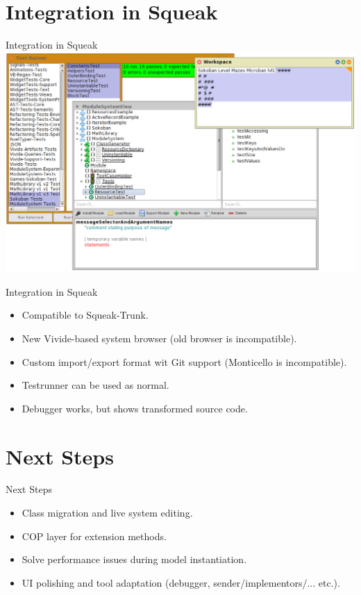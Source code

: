 \documentclass[xcolor=dvipsname, handout]{beamer} %
\begin{document}
\section{Integration in Squeak}
\begin{frame}{Integration in Squeak}
  \centering
  \includegraphics[width=\textwidth]{screenshot_integration.png}
\end{frame}

\begin{frame}{Integration in Squeak}
\begin{itemize}
  \item Compatible to Squeak-Trunk.
  \item New Vivide-based system browser (old browser is incompatible).
  \item Custom import/export format wit Git support (Monticello is incompatible).
  \item Testrunner can be used as normal.
  \item Debugger works, but shows transformed source code.
\end{itemize}
\end{frame}

\section{Next Steps}
\begin{frame}{Next Steps}
  \begin{itemize}
    \item Class migration and live system editing.
    \item COP layer for extension methods.
    \item Solve performance issues during model instantiation.
    \item UI polishing and tool adaptation (debugger, sender/implementors/... etc.).
  \end{itemize}
\end{frame}
\end{document}
